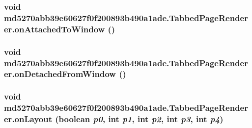\hypertarget{classmd5270abb39e60627f0f200893b490a1ade_1_1_tabbed_page_renderer_2ceb284d7b665527be964c40f6d41f74}{
\subsubsection[{onAttachedToWindow}]{\setlength{\rightskip}{0pt plus 5cm}void md5270abb39e60627f0f200893b490a1ade.TabbedPageRenderer.onAttachedToWindow ()}}
\label{classmd5270abb39e60627f0f200893b490a1ade_1_1_tabbed_page_renderer_2ceb284d7b665527be964c40f6d41f74}


\hypertarget{classmd5270abb39e60627f0f200893b490a1ade_1_1_tabbed_page_renderer_2da48a997944fab9d1e33dfbf720a558}{
\subsubsection[{onDetachedFromWindow}]{\setlength{\rightskip}{0pt plus 5cm}void md5270abb39e60627f0f200893b490a1ade.TabbedPageRenderer.onDetachedFromWindow ()}}
\label{classmd5270abb39e60627f0f200893b490a1ade_1_1_tabbed_page_renderer_2da48a997944fab9d1e33dfbf720a558}


\hypertarget{classmd5270abb39e60627f0f200893b490a1ade_1_1_tabbed_page_renderer_c4353b82562a8ecc7822860dd790a58f}{
\subsubsection[{onLayout}]{\setlength{\rightskip}{0pt plus 5cm}void md5270abb39e60627f0f200893b490a1ade.TabbedPageRenderer.onLayout (boolean {\em p0}, \/  int {\em p1}, \/  int {\em p2}, \/  int {\em p3}, \/  int {\em p4})}}
\label{classmd5270abb39e60627f0f200893b490a1ade_1_1_tabbed_page_renderer_c4353b82562a8ecc7822860dd790a58f}




